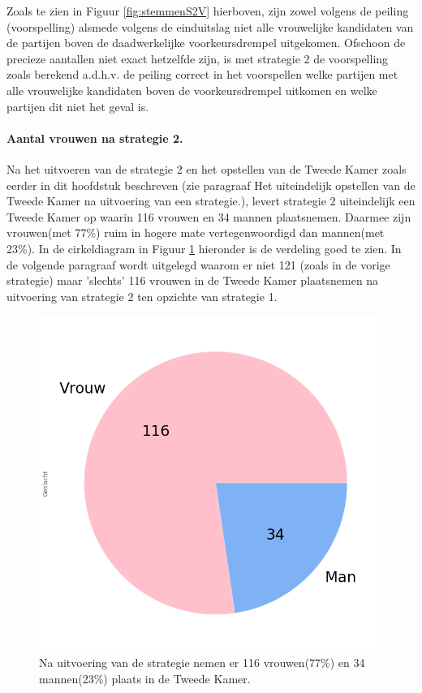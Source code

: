 Zoals te zien in Figuur \ref{fig:stemmenS2V}  hierboven, zijn zowel volgens de peiling (voorspelling) alsmede volgens de einduitslag niet alle vrouwelijke kandidaten van de partijen boven de daadwerkelijke voorkeursdrempel uitgekomen. Ofschoon de precieze aantallen niet exact hetzelfde zijn, is met strategie 2 de voorspelling zoals berekend a.d.h.v. de peiling correct in het voorspellen welke partijen met alle vrouwelijke kandidaten boven de voorkeursdrempel uitkomen en welke partijen dit niet het geval is.




\paragraph{Aantal vrouwen na strategie 2.}
Na het uitvoeren van de strategie 2 en het opstellen van de Tweede Kamer zoals eerder in dit hoofdstuk beschreven (zie paragraaf Het uiteindelijk opstellen van de Tweede Kamer na uitvoering van een strategie.), levert strategie 2 uiteindelijk een Tweede Kamer op waarin 116 vrouwen en 34 mannen plaatsnemen. Daarmee zijn vrouwen(met 77\%) ruim in hogere mate vertegenwoordigd dan mannen(met 23\%). In de cirkeldiagram in Figuur \ref{fig:pcS2V} hieronder is de verdeling goed te zien. In de volgende paragraaf wordt uitgelegd waarom er niet 121 (zoals in de vorige strategie) maar 'slechts' 116 vrouwen in de Tweede Kamer plaatsnemen na uitvoering van strategie 2 ten opzichte van strategie 1.

\begin{figure}[H]
\centering
	\includegraphics[width=0.35\linewidth]{pie_chart_willekeurig.png}

			\caption{Na uitvoering van de strategie nemen er 116 vrouwen(77\%) en 34 mannen(23\%) plaats in de Tweede Kamer.}

\label{fig:pcS2V}
\end{figure}

